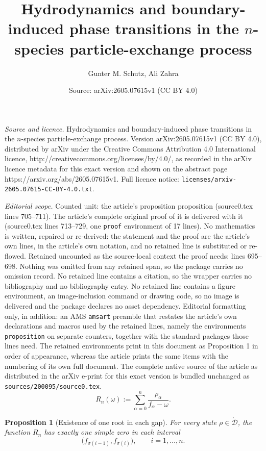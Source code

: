 \documentclass[10pt,a4paper]{amsart}
\title{Hydrodynamics and boundary-induced phase transitions in the $n$-species particle-exchange process}
\author{Gunter M. Schutz, Ali Zahra}
\date{Source: arXiv:2605.07615v1 (CC BY 4.0)}
\newtheorem{proposition}{Proposition}
\begin{document}
\maketitle

\noindent\emph{Source and licence.} Hydrodynamics and boundary-induced phase transitions in the $n$-species particle-exchange process. Version arXiv:2605.07615v1 (CC BY 4.0), distributed by arXiv under the Creative Commons Attribution 4.0 International licence, http://creativecommons.org/licenses/by/4.0/, as recorded in the arXiv licence metadata for this exact version and shown on the abstract page https://arxiv.org/abs/2605.07615v1. Full licence notice: \texttt{licenses/arxiv-2605.07615-CC-BY-4.0.txt}.\par\smallskip

\noindent\textit{Editorial scope.} Counted unit: the article's proposition proposition (source0.tex lines 705--711). The article's complete original proof of it is delivered with it (source0.tex lines 713--729, one \texttt{proof} environment of 17 lines). No mathematics is written, repaired or re-derived: the statement and the proof are the article's own lines, in the article's own notation, and no retained line is substituted or re-flowed.  Retained uncounted as the source-local context the proof needs: lines 695--698.  Nothing was omitted from any retained span, so the package carries no omission record.  No retained line contains a citation, so the wrapper carries no bibliography and no bibliography entry.  No retained line contains a figure environment, an image-inclusion command or drawing code, so no image is delivered and the package declares no asset dependency.  Editorial formatting only, in addition: an AMS \texttt{amsart} preamble that restates the article's own declarations and macros used by the retained lines, namely the environments \texttt{proposition} on separate counters, together with the standard packages those lines need.  The retained environments print in this document as Proposition 1 in order of appearance, whereas the article prints the same items with the numbering of its own full document.  The complete native source of the article as distributed in the arXiv e-print for this exact version is bundled unchanged as \texttt{sources/200095/source0.tex}.
\begin{equation}
R_n(\omega) := \sum_{\alpha=0}^n \frac{\rho_\alpha}{f_\alpha-\omega}.
\label{eq:Rmu}
\end{equation}

\begin{proposition}[Existence of one root in each gap]
For every state $\rho\in\mathring{\mathcal D}$, the function $R_n$ has exactly one simple zero in each interval
\[
\bigl(f_{\sigma(i-1)},f_{\sigma(i)}\bigr),
\qquad i=1,\dots,n.
\]
\end{proposition}
\end{document}
